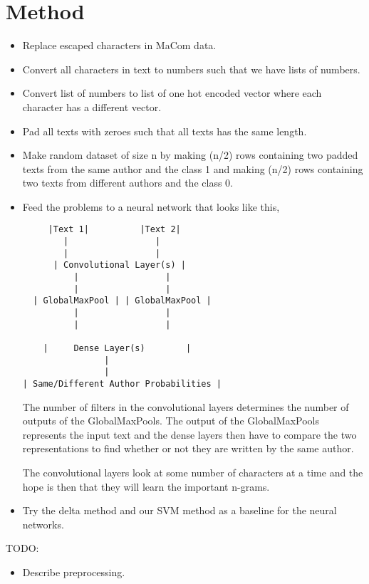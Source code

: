 \section{Method} \label{sec:method} 

\begin{itemize}
    \item Replace escaped characters in MaCom data.
    \item Convert all characters in text to numbers such that we have lists of
        numbers.
    \item Convert list of numbers to list of one hot encoded vector where each
        character has a different vector.
    \item Pad all texts with zeroes such that all texts has the same length.
    \item Make random dataset of size n by making (n/2) rows containing two
        padded texts from the same author and the class 1 and making (n/2) rows
        containing two texts from different authors and the class 0.
    \item Feed the problems to a neural network that looks like this,

        \begin{lstlisting}
     |Text 1|          |Text 2|
        |                 |
        |                 |
      | Convolutional Layer(s) |
          |                 |
          |                 |
  | GlobalMaxPool | | GlobalMaxPool |
          |                 |
          |                 |

    |     Dense Layer(s)        |
                |
                |
| Same/Different Author Probabilities |
        \end{lstlisting}

        The number of filters in the convolutional layers determines the number
        of outputs of the GlobalMaxPools. The output of the GlobalMaxPools
        represents the input text and the dense layers then have to compare the
        two representations to find whether or not they are written by the same
        author.

        The convolutional layers look at some number of characters at a time and
        the hope is then that they will learn the important n-grams.

    \item Try the delta method and our SVM method as a baseline for the neural
        networks.

\end{itemize}

TODO:

\begin{itemize}
    \item Describe preprocessing.
\end{itemize}
